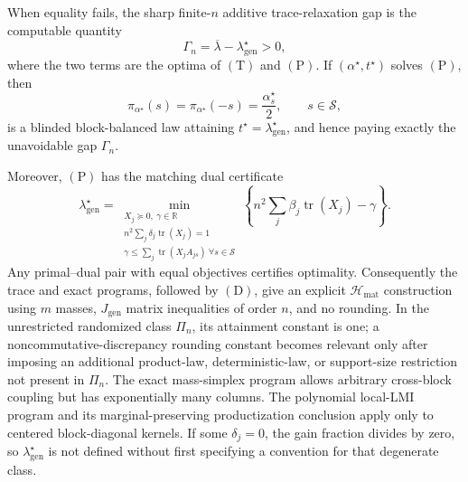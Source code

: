 When equality fails, the sharp finite-\(n\) additive trace-relaxation gap is the computable quantity
\[
\Gamma_n=\overline\lambda-\lambda_{\mathrm{gen}}^\star>0,
\tag{G}
\]
where the two terms are the optima of \((\mathrm T)\) and \((\mathrm P)\). If \((\alpha^\star,t^\star)\) solves \((\mathrm P)\), then
\[
\pi_{\alpha^\star}(s)=\pi_{\alpha^\star}(-s)=\frac{\alpha_s^\star}{2},
\qquad s\in\mathscr S,
\tag{D}
\]
is a blinded block-balanced law attaining \(t^\star=\lambda_{\mathrm{gen}}^\star\), and hence paying exactly the unavoidable gap \(\Gamma_n\).

Moreover, \((\mathrm P)\) has the matching dual certificate
\[
\lambda_{\mathrm{gen}}^\star
=\min_{\substack{X_j\succeq0,\ \gamma\in\mathbb R\\
n^2\sum_j\delta_j\operatorname{tr}(X_j)=1\\
\gamma\le\sum_j\operatorname{tr}(X_jA_{js})\ \forall s\in\mathscr S}}
\left\{
n^2\sum_j\beta_j\operatorname{tr}(X_j)-\gamma
\right\}.
\tag{C}
\]
Any primal--dual pair with equal objectives certifies optimality. Consequently the trace and exact programs, followed by \((\mathrm D)\), give an explicit \(\mathcal H_{\mathrm{mat}}\) construction using \(m\) masses, \(J_{\mathrm{gen}}\) matrix inequalities of order \(n\), and no rounding. In the unrestricted randomized class \(\Pi_n\), its attainment constant is one; a noncommutative-discrepancy rounding constant becomes relevant only after imposing an additional product-law, deterministic-law, or support-size restriction not present in \(\Pi_n\). The exact mass-simplex program allows arbitrary cross-block coupling but has exponentially many columns. The polynomial local-LMI program and its marginal-preserving productization conclusion apply only to centered block-diagonal kernels. If some \(\delta_j=0\), the gain fraction divides by zero, so \(\lambda_{\mathrm{gen}}^\star\) is not defined without first specifying a convention for that degenerate class.